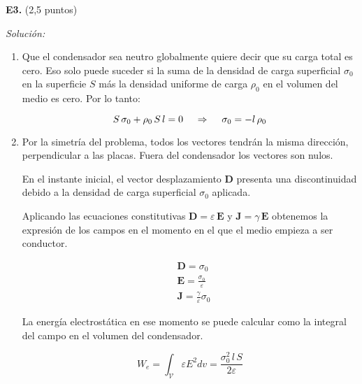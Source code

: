 \textbf{E3.} (2,5 puntos)


\vspace{20px}
\textit{Solución:}
\\

\begin{enumerate}
[label=\alph*)]
    \item Que el condensador sea neutro globalmente quiere decir que su carga total es cero. Eso solo puede suceder si la suma de la densidad de carga superficial
    $\sigma_0$ en la superficie $S$ más la densidad uniforme de carga $\rho_0$ en el volumen del medio es cero. Por lo tanto:

    \begin{equation*}
        S \, \sigma_0 + \rho_0 \, S \, l = 0 \hspace{12px} \Rightarrow \hspace{12px} \sigma_0 = - l \, \rho_0
    \end{equation*}


    \vspace{20px}

    \item Por la simetría del problema, todos los vectores tendrán la misma dirección, perpendicular a las placas. Fuera del condensador los vectores son nulos.

    En el instante inicial, el vector desplazamiento $\textbf{D}$ presenta una discontinuidad debido a la densidad de carga superficial $\sigma_0$ aplicada.

    Aplicando las ecuaciones constitutivas $\textbf{D} = \varepsilon \, \textbf{E}$ y $\textbf{J} = \gamma \, \textbf{E}$ obtenemos la expresión de los campos en el momento
    en el que el medio empieza a ser conductor.

    \begin{align*}
        &\textbf{D}  = \sigma_0 \\[6px]
        & \textbf{E} = \frac{\sigma_0}{\varepsilon} \\[6px]
        & \textbf{J}  = \frac{\gamma}{\varepsilon} \sigma_0
    \end{align*}

    La energía electrostática en ese momento se puede calcular como la integral del campo en el volumen del condensador.

    \begin{equation*}
        W_e = \int_{\mathcal{V}}\varepsilon E^2 dv =  \frac{\sigma_0^2 \, l \, S}{2 \varepsilon}
    \end{equation*}


\end{enumerate}
